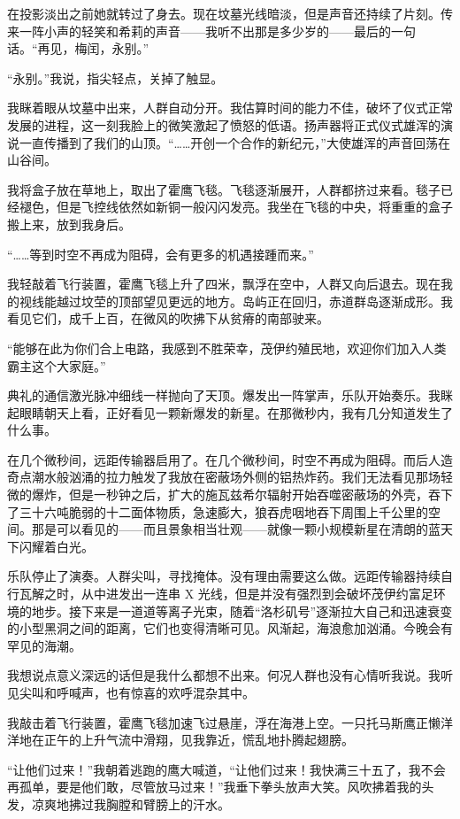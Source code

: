 \documentclass[AutoFakeBold=true]{book}
\begin{document}
在投影淡出之前她就转过了身去。现在坟墓光线暗淡，但是声音还持续了片刻。传来一阵小声的轻笑和希莉的声音——我听不出那是多少岁的——最后的一句话。``再见，梅闰，永别。''

``永别。''我说，指尖轻点，关掉了触显。

\vspace*{1em}

我眯着眼从坟墓中出来，人群自动分开。我估算时间的能力不佳，破坏了仪式正常发展的进程，这一刻我脸上的微笑激起了愤怒的低语。扬声器将正式仪式雄浑的演说一直传播到了我们的山顶。``……开创一个合作的新纪元，''大使雄浑的声音回荡在山谷间。

我将盒子放在草地上，取出了霍鹰飞毯。飞毯逐渐展开，人群都挤过来看。毯子已经褪色，但是飞控线依然如新铜一般闪闪发亮。我坐在飞毯的中央，将重重的盒子搬上来，放到我身后。

``……等到时空不再成为阻碍，会有更多的机遇接踵而来。''

我轻敲着飞行装置，霍鹰飞毯上升了四米，飘浮在空中，人群又向后退去。现在我的视线能越过坟茔的顶部望见更远的地方。岛屿正在回归，赤道群岛逐渐成形。我看见它们，成千上百，在微风的吹拂下从贫瘠的南部驶来。

``能够在此为你们合上电路，我感到不胜荣幸，茂伊约殖民地，欢迎你们加入人类霸主这个大家庭。''

典礼的通信激光脉冲细线一样抛向了天顶。爆发出一阵掌声，乐队开始奏乐。我眯起眼睛朝天上看，正好看见一颗新爆发的新星。在那微秒内，我有几分知道发生了什么事。

在几个微秒间，远距传输器启用了。在几个微秒间，时空不再成为阻碍。而后人造奇点潮水般汹涌的拉力触发了我放在密蔽场外侧的铝热炸药。我们无法看见那场轻微的爆炸，但是一秒钟之后，扩大的施瓦兹希尔辐射开始吞噬密蔽场的外壳，吞下了三十六吨脆弱的十二面体物质，急速膨大，狼吞虎咽地吞下周围上千公里的空间。那是可以看见的——而且景象相当壮观——就像一颗小规模新星在清朗的蓝天下闪耀着白光。

乐队停止了演奏。人群尖叫，寻找掩体。没有理由需要这么做。远距传输器持续自行瓦解之时，从中进发出一连串 X 光线，但是并没有强烈到会破坏茂伊约富足环境的地步。接下来是一道道等离子光束，随着``洛杉矶号''逐渐拉大自己和迅速衰变的小型黑洞之间的距离，它们也变得清晰可见。风渐起，海浪愈加汹涌。今晚会有罕见的海潮。

我想说点意义深远的话但是我什么都想不出来。何况人群也没有心情听我说。我听见尖叫和呼喊声，也有惊喜的欢呼混杂其中。

我敲击着飞行装置，霍鹰飞毯加速飞过悬崖，浮在海港上空。一只托马斯鹰正懒洋洋地在正午的上升气流中滑翔，见我靠近，慌乱地扑腾起翅膀。

``让他们过来！''我朝着逃跑的鹰大喊道，``让他们过来！我快满三十五了，我不会再孤单，要是他们敢，尽管放马过来！''我垂下拳头放声大笑。风吹拂着我的头发，凉爽地拂过我胸膛和臂膀上的汗水。
\end{document}
